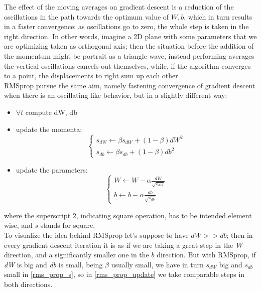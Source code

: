 \documentclass[12pt, a4paper]{report}
\theoremstyle{definition}
\begin{document}
The effect of the moving averages on gradient descent is a reduction of the oscillations in the path towards the optimum value of $W,b$, which in turn results in a faster convergence: as oscillations go to zero, the whole step is taken in the right direction. In other words, imagine a 2D plane with some parameters that we are optimizing taken as orthogonal axis; then the situation before the addition of the momentum might be portrait as a triangle wave, instead performing averages the vertical oscillations cancels out themselves, while, if the algorithm converges to a point, the displacements to right sum up each other.\\
\newline \noindent RMSprop pursue the same aim, namely fastening convergence of gradient descent when there is an oscillating like behavior, but in a slightly different way:
\begin{itemize}\label{RMSprop}
	\item $\forall t$ compute dW, db
	\item update the momenta: 
	\begin{equation}\label{rms_prop_s}
	\begin{cases}
	s_{dW}\longleftarrow\beta s_{dW} + (1-\beta) dW^2\\
	s_{db}\longleftarrow\beta s_{db} + (1-\beta) db^2
	\end{cases}
	\end{equation}
	\item update the parameters:
	\begin{equation}\label{rms_prop_update}
	\begin{cases}
	W\longleftarrow W - \alpha \frac{dW}{\sqrt{s_{dW}}}\\
	b\longleftarrow b - \alpha \frac{db}{\sqrt{s_{db}}}
	\end{cases}
	\end{equation}
\end{itemize}
where the superscript $2$, indicating square operation, has to be intended element wise, and $s$ stands for square.\\
To visualize the idea behind RMSprop let's suppose to have $dW>>db$; then in every gradient descent iteration it is as if we are taking a great step in the \textit{W} direction, and a significantly smaller one in the $b$ direction. But with RMSprop, if \textit{dW} is big and \textit{db} is small, being $\beta$ usually small, we have in turn $s_{dW}$ big and $s_{db}$ small in \eqref{rms_prop_s}, so in \eqref{rms_prop_update} we take comparable steps in both directions.\\
\end{document}
